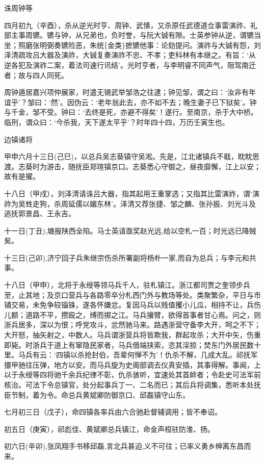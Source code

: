 \documentclass[]{article}
\begin{document}
诛周钟等

四月初九（辛酉），杀从逆光时亨、周钟、武愫，又杀原任武德道佥事雷演祚、礼部主事周镳。镳与钟，从兄弟也，负时誉，与阮大铖有隙。士英参钟从逆，谓镳当坐；照磨张明弼奏镳险恶，朱统\{金类\}摭镳他事：论劾提问。演祚与大铖有怨，刘泽清疏攻吕大器及演祚，大铖复奏演祚不忠、不孝；吏科林有本继之。有旨：`从逆各犯及演祚二案，着法司速行讯结'。光时亨者，与李明睿不同声气，阻驾南迁者；故与四人同死。

周钟遁居嘉兴项仲展家，时遣无锡武举邹浩之往逮；钟见邹，谓之曰：`汝非有年谊乎'？邹曰：`然'。因伪云：`老年翁此去，亦不如不去；晚生妻子已下狱矣'。钟与千金，邹不受。钟曰：`去终是死，亦避不得矣'！遂行。至南京，杀于大中桥。临刑，谓众曰：`今杀我，天下遂太平乎'？时年四十四，万历壬寅生也。

边镇诸将

甲申六月十三日(己巳)，以总兵吴志葵镇守吴淞。先是，江北诸镇兵不戢，眈眈思渡。志葵时为游击，随抚臣郑瑄镇京口。志葵悉心守御之，昼夜靡懈，江上以安；故有是擢。

十八日（甲戌），刘泽清请诛吕大器，指其起用王重掌选；又指其比雷演祚，谓`演祚为吴甡走狗，杀周延儒以媚东林'。泽清又荐张捷、邹之麟、张孙振、刘光斗及逃抚郭景昌、王永吉。

十一日(丁丑),塘报陕西全陷。马士英请亟奖赵光远,给以空札一百；时光远已降贼矣。

十三日(己卯),济宁回子兵朱继宗伤杀所署副将杨朴一家,而自为总兵；与李元和共事。

十八日（甲申），北将于永绶等领马兵千人，驻札镇江。浙江都司贾之奎领步兵至，止其地；及京口营兵与各路零卒分札西门外与教场等处。类聚繁杂，平日与市铺交易，未免争较锱铢，遂各怀嫌忿。复因马兵以贱值攫小儿瓜，相持不让，兵伤儿额；道路不平，攒殴之，缚而掷之江。马兵攘臂，欲得首事者甘心焉。问之，则浙兵居多，深以为恨；呼党攻斗，忿然驰马来。路遇浙营守备李大开，呵之不下；大开怒，抽矢射之，中数人。马兵谓浙营兵将皆欺我，群起攻杀；大开中矢，伤重即毙。时浙兵于道上有窜隐民家者，马兵借端挟索，恣其淫掠；焚东门外居民数十里。马兵有云：`四镇以杀抢封伯，吾辈何惮不为'！仇杀不解，几成大乱。祁抚军擐甲驰往压弹，地方以安。而马兵旋为史阁部调去仪真安插，其事得解。事闻，上以于永绶等四将驰千余兵纪律不彰，仇杀骇听，宜速处其首衅者；令赴史可法军前核治。可法下令总镇官，处分起事兵丁一、二名而已；其后兵将调集，悉听本处抚臣节制，着为令。命总兵黄斌卿防御京口、邱磊镇守山东。

七月初三日（戊子），命四镇各率兵由六合驰赴督辅调用；皆不奉诏。

初五日（庚寅），祁彪佳、黄斌卿总兵镇江，命金声桓驻防淮、扬。

初六日(辛卯),张凤翔手书移邱磊,言北兵甚迫,义不可往；已率义勇乡绅离东昌而来。
\end{document}

